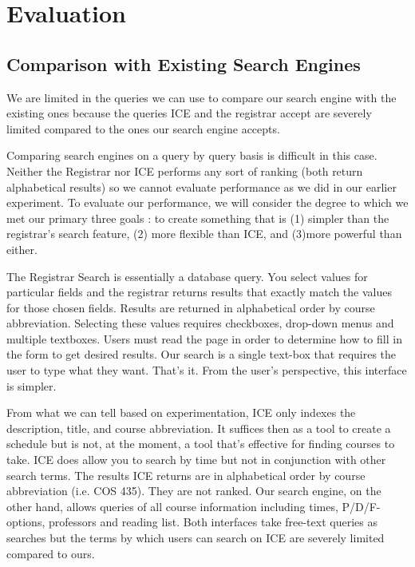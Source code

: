 \documentclass[12pt,letterpaper]{article}
\begin{document}
\section{Evaluation}

\subsection{Comparison with Existing Search Engines}

We are limited in the queries we can use to compare our search engine with the existing ones because the queries ICE and the registrar accept are severely limited compared to the ones our search engine accepts.

Comparing search engines on a query by query basis is difficult in this case. Neither the Registrar nor ICE performs any sort of ranking (both return alphabetical results) so we cannot evaluate performance as we did in our earlier experiment. To evaluate our performance, we will consider the degree to which we met our primary three goals : to create something that is (1) simpler than the registrar's search feature, (2) more flexible than ICE, and (3)more powerful than either. 

The Registrar Search is essentially a database query. You select values for particular fields and the registrar returns results that exactly match the values for those chosen fields. Results are returned in alphabetical order by course abbreviation. Selecting these values requires checkboxes, drop-down menus and multiple textboxes. Users must read the page in order to determine how to fill in the form to get desired results. Our search is a single text-box that requires the user to type what they want. That's it. From the user's perspective, this interface is simpler. 

From what we can tell based on experimentation, ICE only indexes the description, title, and course abbreviation. It suffices then as a tool to create a schedule but is not, at the moment, a tool that's effective for finding courses to take. ICE does allow you to search by time but not in conjunction with other search terms. The results ICE returns are in alphabetical order by course abbreviation (i.e. COS 435). They are not ranked. Our search engine, on the other hand, allows queries of all course information including times, P/D/F-options, professors and reading list. Both interfaces take free-text queries as searches but the terms by which users can search on ICE are severely limited compared to ours. 
  
\end{document}
